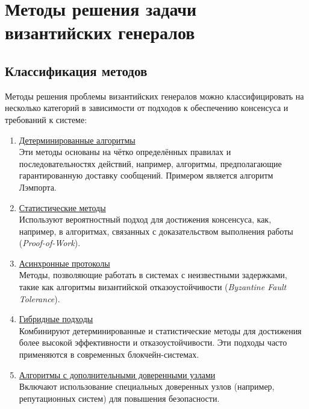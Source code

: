 \section{Методы решения задачи византийских генералов}

\subsection{Классификация методов}

\hspace{1.25cm}
Методы решения проблемы византийских генералов можно классифицировать на несколько категорий в зависимости от подходов к обеспечению консенсуса и требований к системе:

\begin{enumerate}

    \item \underline{Детерминированные алгоритмы}\\
    Эти методы основаны на чётко определённых правилах и последовательностях действий, например, алгоритмы, предполагающие гарантированную доставку сообщений. Примером является алгоритм Лэмпорта.

    \item \underline{Статистические методы}\\
    Используют вероятностный подход для достижения консенсуса, как, например, в алгоритмах, связанных с доказательством выполнения работы (\textit{Proof-of-Work}).

    \item \underline{Асинхронные протоколы}\\
    Методы, позволяющие работать в системах с неизвестными задержками, такие как алгоритмы византийской отказоустойчивости (\textit{Byzantine Fault Tolerance}).

    \item \underline{Гибридные подходы}\\
    Комбинируют детерминированные и статистические методы для достижения более высокой эффективности и отказоустойчивости. Эти подходы часто применяются в современных блокчейн-системах.

    \item \underline{Алгоритмы с дополнительными доверенными узлами}\\
    Включают использование специальных доверенных узлов (например, репутационных систем) для повышения безопасности.

\end{enumerate}


